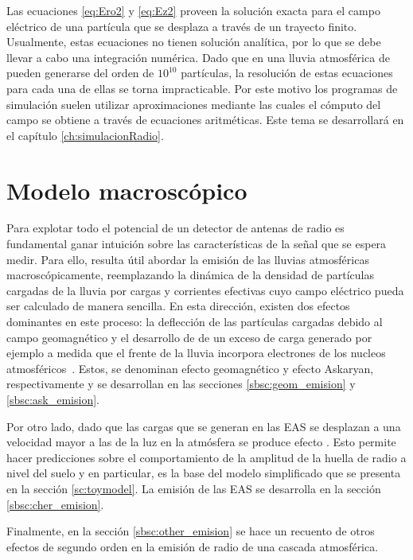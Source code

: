 Las ecuaciones \ref{eq:Ero2} y \ref{eq:Ez2} proveen la soluci\'on exacta para el campo el\'ectrico de una part\'icula que se desplaza a trav\'es de un trayecto finito.
Usualmente, estas ecuaciones no tienen soluci\'on anal\'itica, por lo que se debe llevar a cabo una integraci\'on num\'erica.
Dado que en una lluvia atmosf\'erica de  pueden generarse del orden de $10^10$ part\'iculas, la resoluci\'on de estas ecuaciones para cada una de ellas se torna impracticable.
Por este motivo los programas de simulaci\'on suelen utilizar aproximaciones mediante las cuales el c\'omputo del campo se obtiene a trav\'es de ecuaciones aritm\'eticas.
Este tema se desarrollar\'a en el cap\'itulo \ref{ch:simulacionRadio}.

\section{Modelo macrosc\'opico}

Para explotar todo el potencial de un detector de antenas de radio es fundamental ganar intuici\'on sobre las caracter\'isticas de la se\~nal que se espera medir.
Para ello, resulta \'util abordar la emisi\'on de las lluvias atmosf\'ericas macrosc\'opicamente, reemplazando la din\'amica de la densidad de part\'iculas cargadas de la lluvia por cargas y corrientes efectivas cuyo campo el\'ectrico pueda ser calculado de manera sencilla.
En esta direcci\'on, existen dos efectos dominantes en este proceso: la deflecci\'on de las part\'iculas cargadas debido al campo geomagn\'etico y el desarrollo de de un exceso de carga generado por ejemplo a medida que el frente de la lluvia incorpora electrones de los nucleos atmosf\'ericos~\cite{scholten:2008}.
Estos, se denominan efecto geomagn\'etico y efecto Askaryan, respectivamente y se desarrollan en las secciones \ref{sbsc:geom_emision} y \ref{sbsc:ask_emision}.

Por otro lado, dado que las cargas que se generan en las EAS se desplazan a una velocidad mayor a las de la luz en la atm\'osfera se produce efecto \cher{}.
Esto permite hacer predicciones sobre el comportamiento de la amplitud de la huella de radio a nivel del suelo y en particular, es la base del modelo simplificado que se presenta en la secci\'on \ref{sc:toymodel}. 
La emisi\'on \cher{} de las EAS se desarrolla en la secci\'on \ref{sbsc:cher_emision}.

Finalmente, en la secci\'on \ref{sbsc:other_emision} se hace un recuento de otros efectos de segundo orden en la emisi\'on de radio de una cascada atmosf\'erica.


